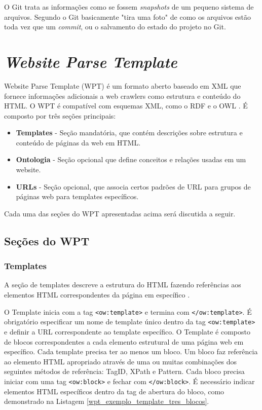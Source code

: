 O Git trata as informações como se fossem \emph{snapshots} de um pequeno sistema de arquivos. Segundo \cite[p. 6]{progit} o Git basicamente "tira uma foto" de como os arquivos estão toda vez que um \emph{commit}, ou o salvamento do estado do projeto no Git.

\pagebreak

\section{\emph{Website Parse Template}}


Website Parse Template (WPT) é um formato aberto baseado em XML que fornece informações adicionais a web crawlers como estrutura e conteúdo do HTML. O WPT é compatível com esquemas XML, como o RDF e o OWL \cite{wpt}. É composto por três seções principais:

\begin{itemize}
	\item \textbf{Templates} - Seção mandatória, que contém descrições sobre estrutura e conteúdo de páginas da web em HTML.
	\item \textbf{Ontologia} - Seção opcional que define conceitos e relações usadas em um website.
	\item \textbf{URLs} - Seção opcional, que associa certos padrões de URL para grupos de páginas web para templates específicos. 
\end{itemize}

Cada uma das seções do WPT apresentadas acima será discutida a seguir.

\subsection{Seções do WPT}

\subsubsection{Templates}

A seção de templates descreve a estrutura do HTML fazendo referências aos elementos HTML correspondentes da página em específico \cite{wpt}.

O Template inicia com a tag \texttt{<ow:template>} e termina com  \texttt{</ow:template>}. É obrigatório especificar um nome de template único dentro da tag \texttt{<ow:template>} e definir a URL correspondente ao template específico. O Template é composto de blocos correspondentes a cada elemento estrutural de uma página web em específico. Cada template precisa ter ao menos um bloco. Um bloco faz referência ao elemento HTML apropriado através de uma ou muitas combinações dos seguintes métodos de referência: TagID, XPath e Pattern. Cada bloco precisa iniciar com uma tag \texttt{<ow:block>} e fechar com \texttt{</ow:block>}. É necessário indicar elementos HTML específicos dentro da tag de abertura do bloco, como demonstrado na Listagem \ref{wpt_exemplo_template_tres_blocos}.

